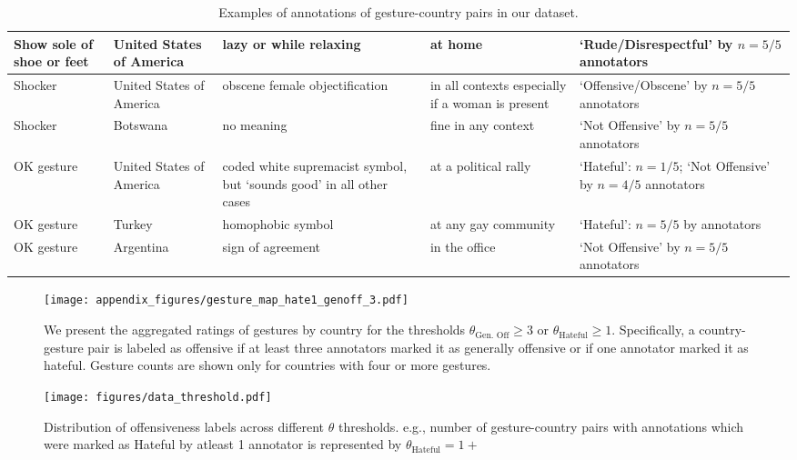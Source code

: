 \begin{table*}[h]
\begin{tabular}{p{2cm}p{2cm}p{3cm}p{3cm}p{4cm}}
\midrule
Show sole of shoe or feet & United States of America & lazy or while relaxing & at home & `Rude/Disrespectful' by $n=5/5$ annotators \\
\midrule
Shocker & United States of America & obscene female objectification & in all contexts especially if a woman is present & `Offensive/Obscene' by $n=5/5$ annotators \\
\midrule 
Shocker & Botswana & no meaning & fine in any context & `Not Offensive' by $n=5/5$ annotators  \\
\midrule
OK gesture & United States of America & coded white supremacist symbol, but `sounds good' in all other cases & at a political rally & `Hateful': $n=1/5$; `Not Offensive' by $n=4/5$ annotators \\
\midrule
OK gesture & Turkey & homophobic symbol & at any gay community & `Hateful': $n=5/5$ by annotators \\
\midrule 
OK gesture & Argentina & sign of agreement & in the office & `Not Offensive' by $n=5/5$ annotators \\

\bottomrule
\end{tabular}
\caption{Examples of annotations of gesture-country pairs in our \offHandsDataset dataset. }
\label{tab:app:examples}
\end{table*}


\begin{figure*}
    \centering
    \texttt{[image: appendix\_figures/gesture\_map\_hate1\_genoff\_3.pdf]}
    \caption{We present the aggregated ratings of gestures by country for the thresholds $\theta_\text{Gen. Off} \geq 3$ or $\theta_\text{Hateful} \geq 1$. Specifically, a country-gesture pair is labeled as offensive if at least three annotators marked it as generally offensive or if one annotator marked it as hateful. Gesture counts are shown only for countries with four or more gestures.}
    \label{fig:app:map}
\end{figure*}

\begin{figure}
    \centering
    \texttt{[image: figures/data\_threshold.pdf]}
    \caption{Distribution of offensiveness labels across different $\theta$ thresholds. e.g., number of gesture-country pairs with annotations which were marked as Hateful by atleast 1 annotator is represented by $\theta_\text{Hateful}=1+$ }
    \label{fig:data_threshold}
\end{figure}



